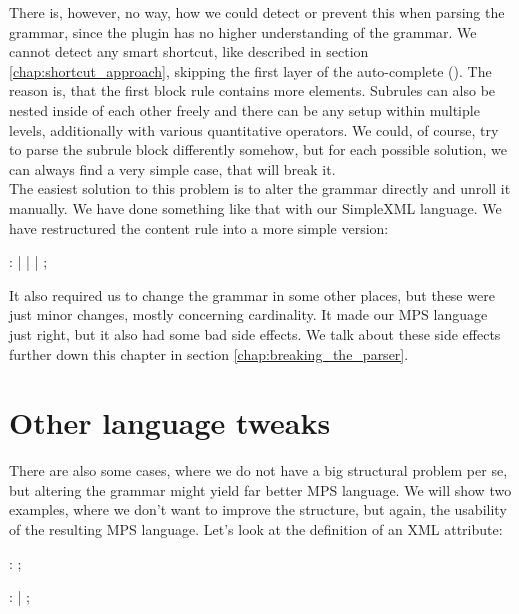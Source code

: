 There is, however, no way, how we could detect or prevent this when parsing the grammar, since the plugin has no higher understanding of the grammar.
We cannot detect any smart shortcut, like described in section \ref{chap:shortcut_approach}, skipping the first layer of the auto-complete ().
The reason is, that the first block rule contains more elements.
Subrules can also be nested inside of each other freely and there can be any setup within multiple levels, additionally with various quantitative operators.
We could, of course, try to parse the subrule block differently somehow, but for each possible solution, we can always find a very simple case, that will break it.
\\

The easiest solution to this problem is to alter the grammar directly and unroll it manually.
We have done something like that with our SimpleXML language.
We have restructured the content rule into a more simple version:

\begin{antlr}
	    :   
	           |   
	           |   
	           |   
	           ;
\end{antlr}

It also required us to change the grammar in some other places, but these were just minor changes, mostly concerning cardinality.
It made our MPS language just right, but it also had some bad side effects.
We talk about these side effects further down this chapter in section \ref{chap:breaking_the_parser}.

\section{Other language tweaks}

There are also some cases, where we do not have a big structural problem per se, but altering the grammar might yield far better MPS language.
We will show two examples, where we don't want to improve the structure, but again, the usability of the resulting MPS language.
Let's look at the definition of an XML attribute:

\begin{antlr}
	   :    \literal{=}  ;

	      :    \regex{~["]*} 
	            |    \regex{~[']*} 
	            ;
\end{antlr}

